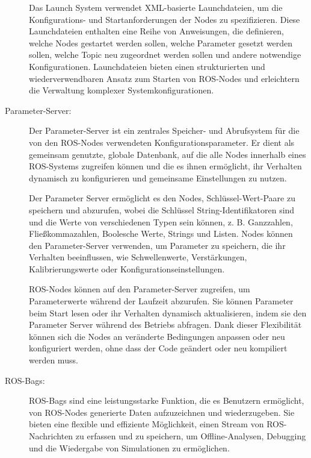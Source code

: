 \begin{description}
    Das Launch System verwendet XML-basierte Launchdateien, um die Konfigurations- und Startanforderungen der Nodes zu spezifizieren. Diese Launchdateien enthalten eine Reihe von Anweisungen, die definieren, welche Nodes gestartet werden sollen, welche Parameter gesetzt werden sollen, welche Topic neu zugeordnet werden sollen und andere notwendige Konfigurationen. Launchdateien bieten einen strukturierten und wiederverwendbaren Ansatz zum Starten von ROS-Nodes und erleichtern die Verwaltung komplexer Systemkonfigurationen.

    \cite[vgl.][]{roslaunch}
    
    \item[Parameter-Server:] Der Parameter-Server ist ein zentrales Speicher- und Abrufsystem für die von den ROS-Nodes verwendeten Konfigurationsparameter. Er dient als gemeinsam genutzte, globale Datenbank, auf die alle Nodes innerhalb eines \ac{ROS}-Systems zugreifen können und die es ihnen ermöglicht, ihr Verhalten dynamisch zu konfigurieren und gemeinsame Einstellungen zu nutzen.

    Der Parameter Server ermöglicht es den Nodes, Schlüssel-Wert-Paare zu speichern und abzurufen, wobei die Schlüssel String-Identifikatoren sind und die Werte von verschiedenen Typen sein können, z. B. Ganzzahlen, Fließkommazahlen, Boolesche Werte, Strings und Listen. Nodes können den Parameter-Server verwenden, um Parameter zu speichern, die ihr Verhalten beeinflussen, wie Schwellenwerte, Verstärkungen, Kalibrierungswerte oder Konfigurationseinstellungen.
    
    ROS-Nodes können auf den Parameter-Server zugreifen, um Parameterwerte während der Laufzeit abzurufen. Sie können Parameter beim Start lesen oder ihr Verhalten dynamisch aktualisieren, indem sie den Parameter Server während des Betriebs abfragen. Dank dieser Flexibilität können sich die Nodes an veränderte Bedingungen anpassen oder neu konfiguriert werden, ohne dass der Code geändert oder neu kompiliert werden muss.

    \cite[vgl.][]{parameter-server}
    
    
    \item[ROS-Bags:] ROS-Bags sind eine leistungsstarke Funktion, die es Benutzern ermöglicht, von ROS-Nodes generierte Daten aufzuzeichnen und wiederzugeben. Sie bieten eine flexible und effiziente Möglichkeit, einen Stream von \ac{ROS}-Nachrichten zu erfassen und zu speichern, um Offline-Analysen, Debugging und die Wiedergabe von Simulationen zu ermöglichen.


\end{description}

